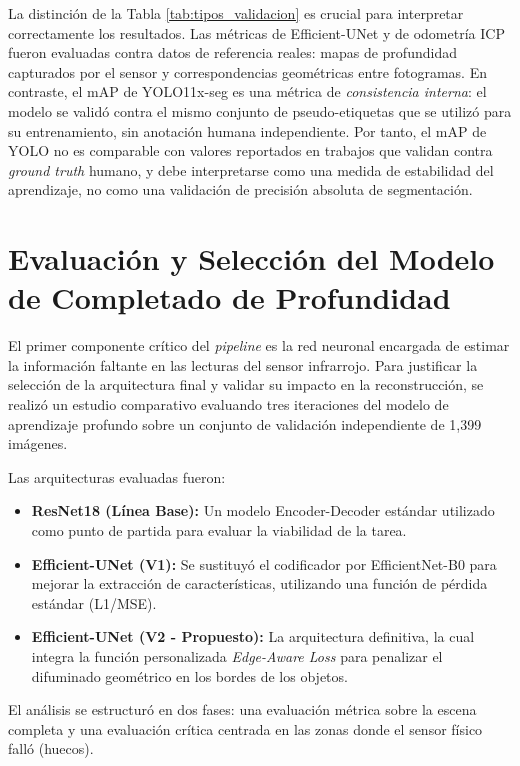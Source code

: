 \documentclass[12pt, a4, twoside, openany]{report}
\begin{document}
La distinción de la Tabla \ref{tab:tipos_validacion} es crucial para interpretar correctamente los resultados. Las métricas de Efficient-UNet y de odometría ICP fueron evaluadas contra datos de referencia reales: mapas de profundidad capturados por el sensor y correspondencias geométricas entre fotogramas. En contraste, el mAP de YOLO11x-seg es una métrica de \textit{consistencia interna}: el modelo se validó contra el mismo conjunto de pseudo-etiquetas que se utilizó para su entrenamiento, sin anotación humana independiente. Por tanto, el mAP de YOLO no es comparable con valores reportados en trabajos que validan contra \textit{ground truth} humano, y debe interpretarse como una medida de estabilidad del aprendizaje, no como una validación de precisión absoluta de segmentación.

\section{Evaluación y Selección del Modelo de Completado de Profundidad}

El primer componente crítico del \textit{pipeline} es la red neuronal encargada de estimar la información faltante en las lecturas del sensor infrarrojo. Para justificar la selección de la arquitectura final y validar su impacto en la reconstrucción, se realizó un estudio comparativo evaluando tres iteraciones del modelo de aprendizaje profundo sobre un conjunto de validación independiente de 1{,}399 imágenes.

Las arquitecturas evaluadas fueron:
\begin{itemize}
    \item \textbf{ResNet18 (Línea Base):} Un modelo Encoder-Decoder estándar utilizado como punto de partida para evaluar la viabilidad de la tarea.
    \item \textbf{Efficient-UNet (V1):} Se sustituyó el codificador por EfficientNet-B0 para mejorar la extracción de características, utilizando una función de pérdida estándar (L1/MSE).
    \item \textbf{Efficient-UNet (V2 - Propuesto):} La arquitectura definitiva, la cual integra la función personalizada \textit{Edge-Aware Loss} para penalizar el difuminado geométrico en los bordes de los objetos.
\end{itemize}

El análisis se estructuró en dos fases: una evaluación métrica sobre la escena completa y una evaluación crítica centrada en las zonas donde el sensor físico falló (huecos).
\end{document}
